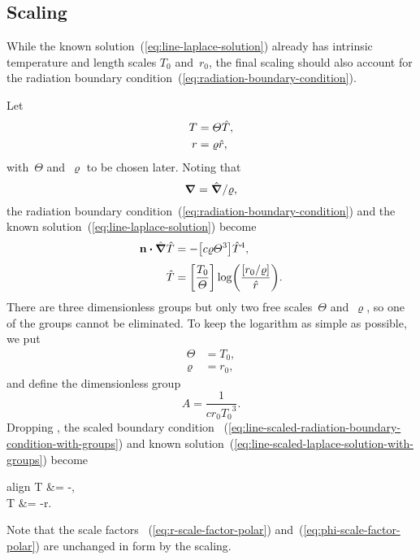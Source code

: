 \subsection{Scaling}
\label{sec:polar.line.scaling}

While the known solution~(\ref{eq:line-laplace-solution})
already has intrinsic temperature and length scales $T_0$ and~$r_0$,
the final scaling should also account for
the radiation boundary condition~(\ref{eq:radiation-boundary-condition}).

Let
\begin{align}
  T &= \varTheta \hat{T}, \label{eq:line-temperature-scaling} \\
  r &= \varrho \hat{r}, \label{eq:line-r-scaling}
\end{align}
with~$\Theta$ and~$\varrho$ to be chosen later.
Noting that
\begin{equation}
  \mathop{}\!\boldsymbol{\mathbf{\nabla}} = \mathop{}\!\hat{\mathop{}\!\boldsymbol{\mathbf{\nabla}}} / \varrho,
  \label{eq:line-del-scaling}
\end{equation}
the radiation boundary condition~(\ref{eq:radiation-boundary-condition})
and the known solution~(\ref{eq:line-laplace-solution})
become
\begin{align}
  \normalvec \dotp \scaleddel \scaled{T}
    &= -\group{c \varrho \Theta^3} \scaled{T}^4,
    \label{eq:line-scaled-radiation-boundary-condition-with-groups}
    \\[\tallspace]
  \scaled{T}
    &=
      \group{\frac{T_0}{\Theta}}
      \log \roundbr*{\frac{\group{r_0 / \varrho}}{\scaled{r}}}.
    \label{eq:line-scaled-laplace-solution-with-groups}
\end{align}
There are three dimensionless groups
but only two free scales~$\Theta$ and~$\varrho$,
so one of the groups cannot be eliminated.
To keep the logarithm as simple as possible,
we put
\begin{align}
  \Theta &= T_0,
    \label{eq:line-temperature-scale} \\
  \varrho &= r_0,
    \label{eq:line-length-scale}
\end{align}
and define the dimensionless group
\begin{equation}
  A = \frac{1}{c r_0 {T_0}^3}.
  \label{eq:line-dimensionless-group}
\end{equation}
Dropping \scalingmarks, the scaled boundary condition~%
  (\ref{eq:line-scaled-radiation-boundary-condition-with-groups})
and known solution~(\ref{eq:line-scaled-laplace-solution-with-groups})
become
\begin{important}{align}
  \normalvec \dotp \del T &= -,
    \label{eq:line-scaled-radiation-boundary-condition} \\[\tallspace]
  T &= -\log r.
    \label{eq:line-scaled-laplace-solution}
\end{important}
Note that the scale factors~%
  (\ref{eq:r-scale-factor-polar}) and~(\ref{eq:phi-scale-factor-polar})
are unchanged in form by the scaling.

